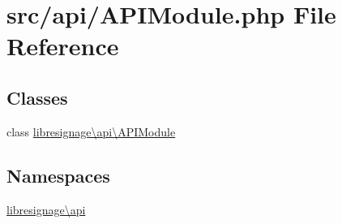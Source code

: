 \hypertarget{APIModule_8php}{}\section{src/api/\+A\+P\+I\+Module.php File Reference}
\label{APIModule_8php}
\subsection*{Classes}
\begin{DoxyCompactItemize}
\item 
class \hyperlink{classlibresignage_1_1api_1_1APIModule}{libresignage\textbackslash{}api\textbackslash{}\+A\+P\+I\+Module}
\end{DoxyCompactItemize}
\subsection*{Namespaces}
\begin{DoxyCompactItemize}
\item 
 \hyperlink{namespacelibresignage_1_1api}{libresignage\textbackslash{}api}
\end{DoxyCompactItemize}
